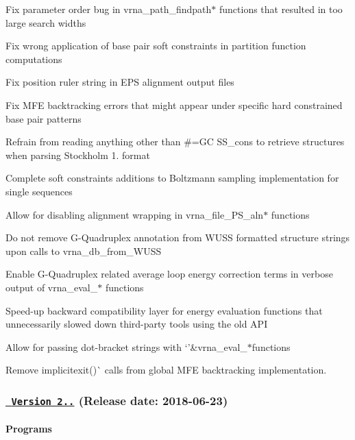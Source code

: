 \begin{DoxyItemize}
\item Fix parameter order bug in {\ttfamily vrna\+\_\+path\+\_\+findpath$\ast$} functions that resulted in too large search widths
\item Fix wrong application of base pair soft constraints in partition function computations
\item Fix position ruler string in E\+PS alignment output files
\item Fix M\+FE backtracking errors that might appear under specific hard constrained base pair patterns
\item Refrain from reading anything other than {\ttfamily \#=GC S\+S\+\_\+cons} to retrieve structures when parsing Stockholm 1. format
\item Complete soft constraints additions to Boltzmann sampling implementation for single sequences
\item Allow for disabling alignment wrapping in {\ttfamily vrna\+\_\+file\+\_\+\+P\+S\+\_\+aln$\ast$} functions
\item Do not remove G-\/\+Quadruplex annotation from W\+U\+SS formatted structure strings upon calls to {\ttfamily vrna\+\_\+db\+\_\+from\+\_\+\+W\+U\+SS}
\item Enable G-\/\+Quadruplex related average loop energy correction terms in verbose output of {\ttfamily vrna\+\_\+eval\+\_\+$\ast$} functions
\item Speed-\/up backward compatibility layer for energy evaluation functions that unnecessarily slowed down third-\/party tools using the old A\+PI
\item Allow for passing dot-\/bracket strings with `'\&vrna\+\_\+eval\+\_\+$\ast${\ttfamily functions}
\item {\ttfamily Remove implicit}exit()\`{} calls from global M\+FE backtracking implementation.
\end{DoxyItemize}

\subsubsection*{\href{https://github.com/ViennaRNA/ViennaRNA/compare/v2.4.7...v2.4.8}{\texttt{ Version 2..}} (Release date\+: 2018-\/06-\/23)}

\paragraph*{Programs}


